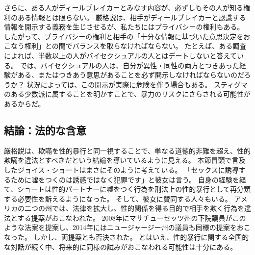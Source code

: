 \documentclass[paper=a4,book,openany]{jlreq}
\begin{document}
さらに、ある人がディールブレイカーとみなす内容が、必ずしもその人が知る権利のある情報とは限らない。
厳格説は、相手がディールブレイカーと認識する情報を開示する義務を生じさせるが、私たちにはプライバシーの権利もある。
したがって、プライバシーの権利と相手の「十分な情報に基づいた意思決定をおこなう権利」との間でバランスを取らなければならない。
たとえば、ある調査によれば、半数以上の人がバイセクシュアルの人とはデートしないと答えている\citep{thorpe16:_why_won_some_peopl_date_bisex}。
では、バイセクシュアルの人は、自分が異性・同性の両方とつきあった経験がある、またはつきあう意思があることを必ず開示しなければならないのだろうか？ 状況によっては、この開示が実際に危険を伴う場合もある。
スティグマのある少数派に属することを明かすことで、暴力のリスクにさらされる可能性があるからだ。

\subsection{結論：法的な含意}

厳格説は、欺瞞を性的暴行と同一視することで、単なる道徳的非難を超え、性的欺瞞を違法とすべきだという結論を導いているように見える。
本節冒頭で言及したジョイス・ショートはまさにそのように考えている。
「セックスに誘導するために嘘をつくのは誘惑ではなく犯罪です」と彼女は言う\citep{mcarthur16:_is_lying_get_laid_form_sexual_assaul}。
自身の経験を経て、ショートは性的パートナーに嘘をつく行為を刑法上の性的暴行として再分類する必要性を訴えるようになった。
そして、彼女に賛同する人々もいる。
アメリカの二つの州では、法律を拡大し、性的関係を得る目的で相手を欺く行為を違法とする提案がおこなわれた。
2008年にマサチューセッツ州の下院議員がこのような法案を提案し、2014年にはニュージャージー州の議員も同様の提案をおこなった。
しかし、両提案とも否決された。
とはいえ、性的暴行に関する全国的な対話が続く中、将来的に同様の試みがおこなわれる可能性は十分にある。
\end{document}
